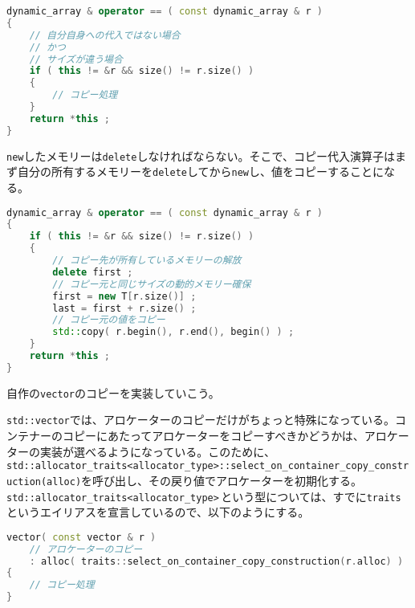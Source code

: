 \begin{lstlisting}[language={C++}]
dynamic_array & operator == ( const dynamic_array & r )
{
    // 自分自身への代入ではない場合
    // かつ
    // サイズが違う場合
    if ( this != &r && size() != r.size() )
    {
        // コピー処理
    }
    return *this ;
}
\end{lstlisting}

\texttt{new}したメモリーは\texttt{delete}しなければならない。そこで、コピー代入演算子はまず自分の所有するメモリーを\texttt{delete}してから\texttt{new}し、値をコピーすることになる。

\begin{lstlisting}[language={C++}]
dynamic_array & operator == ( const dynamic_array & r )
{
    if ( this != &r && size() != r.size() )
    {
        // コピー先が所有しているメモリーの解放
        delete first ;
        // コピー元と同じサイズの動的メモリー確保
        first = new T[r.size()] ;
        last = first + r.size() ;
        // コピー元の値をコピー
        std::copy( r.begin(), r.end(), begin() ) ;
    }
    return *this ;
}
\end{lstlisting}


自作の\texttt{vector}のコピーを実装していこう。


\texttt{std::vector}では、アロケーターのコピーだけがちょっと特殊になっている。コンテナーのコピーにあたってアロケーターをコピーすべきかどうかは、アロケーターの実装が選べるようになっている。このために、\texttt{std::allocator\_traits<allocator\_type>::select\_on\_container\_copy\_{\allowbreak}construction(alloc)}を呼び出し、その戻り値でアロケーターを初期化する。\texttt{std::allocator\_{\allowbreak}traits<allocator\_type>}\,という型については、すでに\texttt{traits}というエイリアスを宣言しているので、以下のようにする。

\begin{lstlisting}[language={C++}]
vector( const vector & r )
    // アロケーターのコピー
    : alloc( traits::select_on_container_copy_construction(r.alloc) )
{
    // コピー処理
}
\end{lstlisting}

